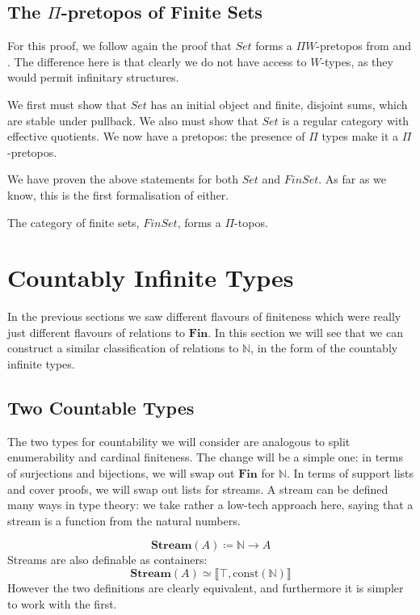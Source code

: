 \subsection{The \(\Pi\)-pretopos of Finite Sets}
For this proof, we follow again the proof that \(\mathit{Set}\) forms a \(\Pi
W\)-pretopos from \cite[chapter 10]{hottbook} and
\cite{rijkeSetsHomotopyType2015}.
The difference here is that clearly we do not have access to \(W\)-types, as
they would permit infinitary structures.

We first must show that \(\mathit{Set}\) has an initial object and finite,
disjoint sums, which are stable under pullback.
We also must show that \(\mathit{Set}\) is a regular category with effective
quotients.
We now have a pretopos: the presence of \(\Pi\) types make it a
\(\Pi\)-pretopos.

We have proven the above statements for both \(\mathit{Set}\) and
\(\mathit{FinSet}\).
As far as we know, this is the first formalisation of either.
\begin{romtheorem} \label{finite-topos}
  The category of finite sets, \(\mathit{FinSet}\), forms a \(\Pi\)-topos.
\end{romtheorem}
\section{Countably Infinite Types} \label{infinite}
In the previous sections we saw different flavours of finiteness which were
really just different flavours of relations to \(\mathbf{Fin}\).
In this section we will see that we can construct a similar classification of
relations to \(\mathbb{N}\), in the form of the countably infinite types.
\subsection{Two Countable Types}
The two types for countability we will consider are analogous to split
enumerability and cardinal finiteness.
The change will be a simple one: in terms of surjections and bijections, we will
swap out \(\mathbf{Fin}\) for \(\mathbb{N}\).
In terms of support lists and cover proofs, we will swap out lists for streams.
A stream can be defined many ways in type theory: we take rather a low-tech
approach here, saying that a stream is a function from the natural numbers.
\begin{romdefinition}[Stream]
  \begin{equation}
    \mathbf{Stream}(A) \coloneqq \mathbb{N} \rightarrow A
  \end{equation}
  Streams are also definable as containers:
  \begin{equation}
    \mathbf{Stream}(A) \simeq \llbracket \top , \text{const}(\mathbb{N}) \rrbracket
  \end{equation}
  However the two definitions are clearly equivalent, and furthermore it is
  simpler to work with the first.
\end{romdefinition}

